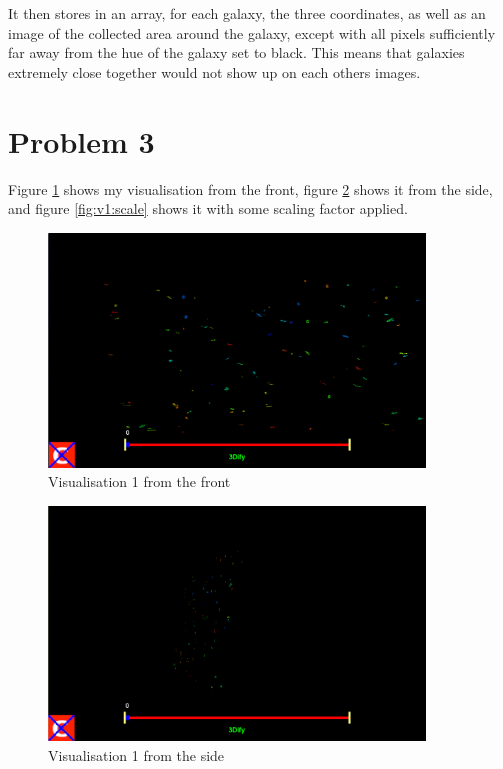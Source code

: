 \documentclass{article}
\begin{document}
It then stores in an array, for each galaxy, the three coordinates, as well as an image of the collected area around the galaxy, except with all pixels sufficiently far away from the hue of the galaxy set to black. This means that galaxies extremely close together would not show up on each others images.

\section*{Problem 3}

Figure \ref{fig:v1:front} shows my visualisation from the front, figure \ref{fig:v1:side} shows it from the side, and figure \ref{fig:v1:scale} shows it with some scaling factor applied.

\begin{figure}
	\centering
	\includegraphics[width=10cm]{2022-04-16-212252_1443x898_scrot.png}
	\caption{Visualisation 1 from the front}
	\label{fig:v1:front}
\end{figure}
\begin{figure}
	\centering
	\includegraphics[width=10cm]{2022-04-16-212305_1441x898_scrot.png}
	\caption{Visualisation 1 from the side}
	\label{fig:v1:side}
\end{figure}
\end{document}
